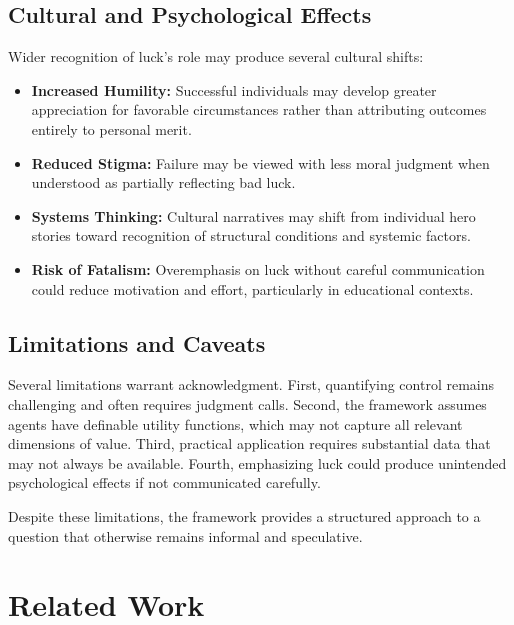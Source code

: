 \subsection{Cultural and Psychological Effects}

Wider recognition of luck's role may produce several cultural shifts:

\begin{itemize}
  \item \textbf{Increased Humility:} Successful individuals may develop
    greater appreciation for favorable circumstances rather than
    attributing outcomes entirely to personal merit.

  \item \textbf{Reduced Stigma:} Failure may be viewed with less moral
    judgment when understood as partially reflecting bad luck.

  \item \textbf{Systems Thinking:} Cultural narratives may shift from
    individual hero stories toward recognition of structural conditions
    and systemic factors.

  \item \textbf{Risk of Fatalism:} Overemphasis on luck without careful
    communication could reduce motivation and effort, particularly in educational
    contexts.
\end{itemize}

\subsection{Limitations and Caveats}

Several limitations warrant acknowledgment. First, quantifying control
remains challenging and often requires judgment calls. Second, the
framework assumes agents have definable utility functions, which may not
capture all relevant dimensions of value. Third, practical application requires
substantial data that may not always be available. Fourth, emphasizing luck
could produce unintended psychological effects if not communicated carefully.

Despite these limitations, the framework provides a structured approach
to a question that otherwise remains informal and speculative.

\section{Related Work}

